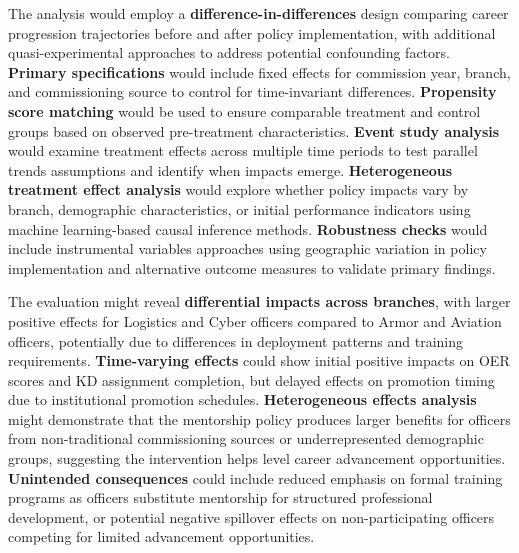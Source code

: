 \documentclass[main.tex]{subfiles}
\begin{document}
The analysis would employ a \textbf{difference-in-differences} design comparing career progression trajectories before and after policy implementation, with additional quasi-experimental approaches to address potential confounding factors\parencite{quasi_experimental,quasi_exp_worldbank}. \textbf{Primary specifications} would include fixed effects for commission year, branch, and commissioning source to control for time-invariant differences. \textbf{Propensity score matching} would be used to ensure comparable treatment and control groups based on observed pre-treatment characteristics\parencite{causal_inference_book}. \textbf{Event study analysis} would examine treatment effects across multiple time periods to test parallel trends assumptions and identify when impacts emerge. \textbf{Heterogeneous treatment effect analysis} would explore whether policy impacts vary by branch, demographic characteristics, or initial performance indicators using machine learning-based causal inference methods\parencite{econml}. \textbf{Robustness checks} would include instrumental variables approaches using geographic variation in policy implementation and alternative outcome measures to validate primary findings.


The evaluation might reveal \textbf{differential impacts across branches}, with larger positive effects for Logistics and Cyber officers compared to Armor and Aviation officers, potentially due to differences in deployment patterns and training requirements\parencite{army_indicators}. \textbf{Time-varying effects} could show initial positive impacts on OER scores and KD assignment completion, but delayed effects on promotion timing due to institutional promotion schedules. \textbf{Heterogeneous effects analysis} might demonstrate that the mentorship policy produces larger benefits for officers from non-traditional commissioning sources or underrepresented demographic groups, suggesting the intervention helps level career advancement opportunities. \textbf{Unintended consequences} could include reduced emphasis on formal training programs as officers substitute mentorship for structured professional development, or potential negative spillover effects on non-participating officers competing for limited advancement opportunities.

\end{document}
